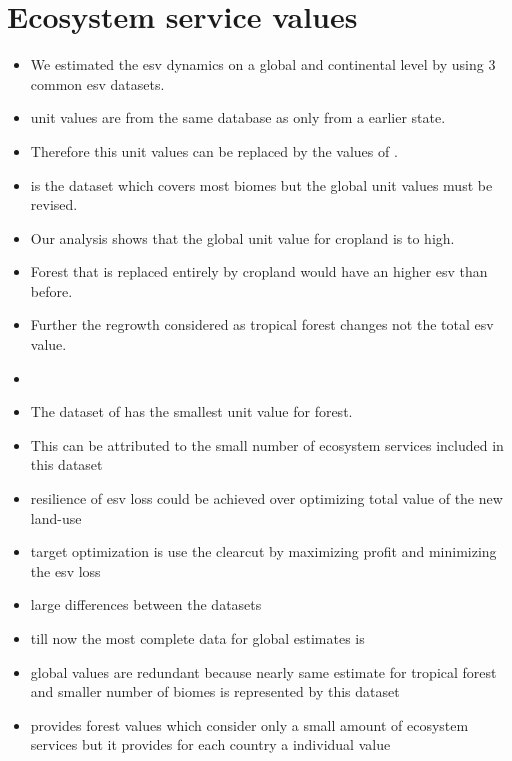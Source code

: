 	\section{Ecosystem service values}
		\begin{itemize}
			\item We estimated the esv dynamics on a global and continental level by using 3 common esv datasets.

			\item \citep{Groot2012} unit values are from the same database as \citep{Costanza2014} only from a earlier state.
			\item Therefore this unit values can be replaced by the values of \citep{Costanza2014}.
			\item \citep{Costanza2014} is the dataset which covers most biomes but the global unit values must be revised.
			\item Our analysis shows that the global unit value for cropland is to high.
			\item Forest that is replaced entirely by cropland would have an higher esv than before.
			\item Further the regrowth considered as tropical forest changes not the total esv value.
			\item 
			\item The dataset of \citep{Siikamaki2015} has the smallest unit value for forest.
			\item This can be attributed to the small number of ecosystem services included in this dataset

			\item resilience of esv loss could be achieved over optimizing total value of the new land-use
			\item target optimization is use the clearcut by maximizing profit and minimizing the esv loss
			\item large differences between the datasets
			\item till now the most complete data for global estimates is \citeauthor{Costanza2014}
			\item \citeauthor{Groot2012} global values are redundant because nearly same estimate for tropical forest and smaller number of biomes is represented by this dataset
			\item \citeauthor{Siikamaki2015} provides forest values which consider only a small amount of ecosystem services but it provides for each country a individual value
		\end{itemize}

